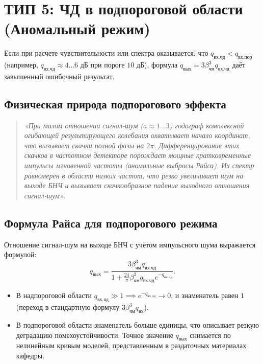 \documentclass[12pt,a4paper]{article}
\begin{document}
\newpage
\section{ТИП 5: ЧД в подпороговой области (Аномальный режим)}
Если при расчете чувствительности или спектра оказывается, что $q_{\text{вх.чд}} < q_{\text{вх.пор}}$ (например, $q_{\text{вх.чд}} \approx 4\dots 6\text{ дБ}$ при пороге $10\text{ дБ}$), формула $q_{\text{вых}} = 3 \beta_{\text{чм}}^3 q_{\text{вх.чд}}$ даёт завышенный ошибочный результат.

\subsection{Физическая природа подпорогового эффекта}
\begin{quote}
\textit{«При малом отношении сигнал-шум ($a \approx 1\dots 3$) годограф комплексной огибающей результирующего колебания охватывает начало координат, что вызывает скачки полной фазы на $2\pi$. Дифференцирование этих скачков в частотном детекторе порождает мощные кратковременные импульсы мгновенной частоты (аномальные выбросы Райса). Их спектр равномерен в области низких частот, что резко увеличивает шум на выходе БНЧ и вызывает скачкообразное падение выходного отношения сигнал-шум».}
\end{quote}

\subsection{Формула Райса для подпорогового режима}
Отношение сигнал-шум на выходе БНЧ с учётом импульсного шума выражается формулой:
\begin{equation}
q_{\text{вых}} = \frac{3 \beta_{\text{чм}}^3 q_{\text{вх.чд}}}{1 + \frac{24}{\pi} \beta_{\text{чм}}^2 q_{\text{вх.чд}} e^{-q_{\text{вх.чд}}}}.
\end{equation}
\begin{itemize}
    \item В надпороговой области $q_{\text{вх.чд}} \gg 1 \implies e^{-q_{\text{вх.чд}}} \to 0$, и знаменатель равен $1$ (переход в стандартную формулу $3 \beta_{\text{чм}}^3 q_{\text{вх}}$).
    \item В подпороговой области знаменатель больше единицы, что описывает резкую деградацию помехоустойчивости. Точное значение $q_{\text{вых}}$ снимается по нелинейным кривым моделей, представленным в раздаточных материалах кафедры.
\end{itemize}
\end{document}
